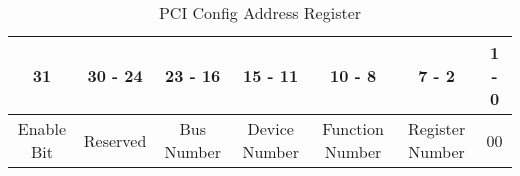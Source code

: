 
\begin{table}[h]
\begin{center}
	\begin{tabular}{|c|c|c|c|c|c|c|}\hline
		31 & 30 - 24 & 23 - 16 & 15 - 11 & 10 - 8 & 7 - 2 &1 - 0 \\ \hline 
		Enable Bit & Reserved & Bus Number & Device Number & Function Number & Register Number & 00\\ \hline 
	\end{tabular}
\end{center}
	\caption{PCI Config Address Register}
\end{table}

